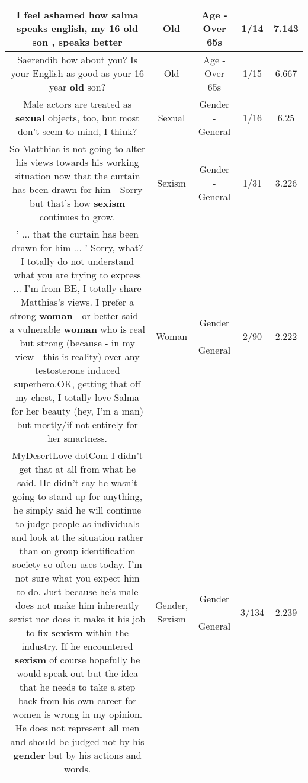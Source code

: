\documentclass[11pt]{article}
\newlength\mylength
\begin{document}
\begin{center}
\begin{longtable}{|C{.65\mylength}|C{.30\mylength}|C{.12\mylength}|C{.12\mylength}|C{.12\mylength}|}
  \small I feel ashamed how salma speaks english,  my 16 \textbf{old} son , speaks better\normalsize   & Old & Age - Over 65s & 1/14 & 7.143 \\  \hline
  \small Saerendib how about you? Is your English as good as your 16 year \textbf{old} son?\normalsize   & Old & Age - Over 65s & 1/15 & 6.667 \\  \hline
  \small Male actors are treated as \textbf{sexual} objects, too, but most don't seem to mind, I think?\normalsize   & Sexual & Gender - General & 1/16 & 6.25 \\  \hline
  \small So Matthias is not going to alter his views towards his working situation now that the curtain has been drawn for him - Sorry but that's how \textbf{sexism} continues to grow.\normalsize   & Sexism & Gender - General & 1/31 & 3.226 \\  \hline
  \small ' ... that the curtain has been drawn for him ... ' Sorry, what? I totally do not understand what you are trying to express ... I'm from BE, I totally share Matthias's views. I prefer a strong \textbf{woman} - or better said - a vulnerable \textbf{woman} who is real but strong (because - in my view - this is reality) over any testosterone induced superhero.OK, getting that off my chest, I totally love Salma for her beauty (hey, I'm a man) but mostly/if not entirely for her smartness.\normalsize   & Woman & Gender - General & 2/90 & 2.222 \\  \hline
  \small MyDesertLove dotCom I didn't get that at all from what he said. He didn't say he wasn't going to stand up for anything, he simply said he will continue to judge people as individuals and look at the situation rather than on group identification society so often uses today. I'm not sure what you expect him to do. Just because he's male does not make him inherently sexist nor does it make it his job to fix \textbf{sexism} within the industry. If he encountered \textbf{sexism} of course hopefully he would speak out but the idea that he needs to take a step back from his own career for women is wrong in my opinion. He does not represent all men and should be judged not by his \textbf{gender} but by his actions and words.\normalsize   & Gender, Sexism & Gender - General & 3/134 & 2.239 \\  \hline

\end{longtable}
\end{center}
\end{document}
